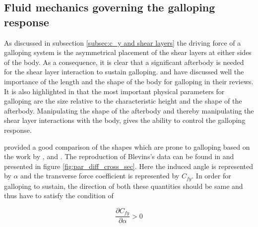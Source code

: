 \subsection{Fluid mechanics governing the galloping response}
\label{subsec:fluid_mechanics_of_galloping}
 
 As discussed in subsection \ref{subsec:c_y and shear layers} the driving force of a galloping system is the asymmetrical placement of the shear layers at either sides of the body. As a consequence, it is clear that a significant afterbody is needed for the shear layer interaction to sustain galloping. \citet{Parkinson1974,Parkinson1989} and \citet{Bearman1987} have discussed well the importance of the length and the shape of the body for galloping in their reviews. It is also highlighted in \citet{Parkinson1974} that the most important physical parameters for galloping are the size relative to the characteristic height and the shape of the afterbody. Manipulating the shape of the afterbody and thereby manipulating the shear layer interactions with the body, gives the ability to control the galloping response.
 
\citet{Blevins1990} provided a good comparison of the shapes which are prone to galloping based on the work by \citet{Parkinson1961}, \citet{Nakamura1975a} and \citet{Nakamura1977}. The reproduction of Blevins's data can be found in \citet{Paidoussis2010} and presented in figure \ref{fig:par_diff_cross_sec}. Here the induced angle is represented by $\alpha$ and the transverse force coefficient is represented by $C_{fy}$. In order for galloping to sustain, the direction of both these quantities should be same and thus have to satisfy the condition of 

\begin{equation}
\frac{\partial C_{fy}}{\partial \alpha } >0
\end{equation}  
    
 
 
